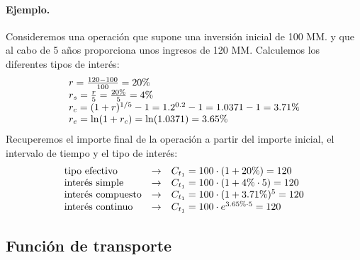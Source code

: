\paragraph{Ejemplo.}
Consideremos una operaci\'on que supone una inversi\'on inicial de 100 MM. y que 
al cabo de 5 a\~{n}os proporciona unos ingresos de 120 MM. 
\newline
\newline
Calculemos los diferentes tipos de inter\'es:
\begin{displaymath}
\begin{array}{l}
r = \frac{120-100}{100} = 20 \% \cr
r_s= \frac{r}{5} = \frac{20 \%}{5} = 4 \% \cr
r_c= (1+r) ^ {1/5} - 1 = 1.2^{0.2} - 1 = 1.0371 - 1 = 3.71 \% \cr
r_e= \ln(1 + r_c) = \ln(1.0371) = 3.65 \%
\end{array}
\end{displaymath}
\newline
\newline
Recuperemos el importe final de la operaci\'on a partir del importe inicial, 
el intervalo de tiempo y el tipo de inter\'es:
\begin{displaymath}
\begin{array}{lcl}
\textrm{tipo efectivo}       & \rightarrow & C_{t_1} = 100 \cdot (1 + 20\%) = 120 \cr
\textrm{inter\'es simple}    & \rightarrow & C_{t_1} = 100 \cdot (1 + 4\% \cdot 5) = 120 \cr
\textrm{inter\'es compuesto} & \rightarrow & C_{t_1} = 100 \cdot (1 + 3.71\%)^5 = 120 \cr
\textrm{inter\'es continuo}  & \rightarrow & C_{t_1} = 100 \cdot e^{3.65 \% \cdot 5} = 120
\end{array}
\end{displaymath}

\subsection{Funci\'on de transporte}

